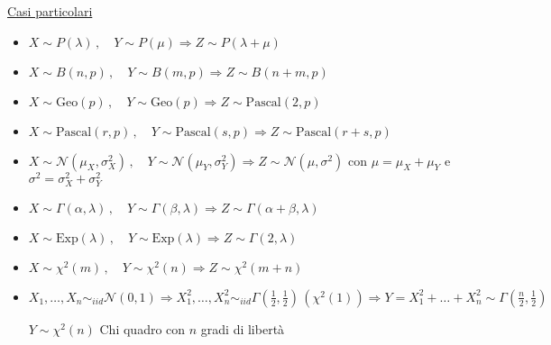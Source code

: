 \documentclass[openany]{book} %
\begin{document}
\underline{Casi particolari}

\begin{itemize}

	\item $X\sim P(\lambda)\,,\quad Y\sim P(\mu)\Rightarrow Z\sim P(\lambda + \mu)$

	\item $X\sim B(n,p)\,,\quad Y\sim B(m,p)\Rightarrow Z\sim B(n+m,p)$

	\item $X\sim \text{Geo}(p)\,,\quad Y\sim \text{Geo}(p)\Rightarrow Z\sim \text{Pascal}(2,p)$

	\item $X\sim \text{Pascal}(r,p)\,,\quad Y\sim \text{Pascal}(s,p)\Rightarrow Z\sim \text{Pascal}(r+s,p)$

	\item $X\sim \mathcal{N}(\mu_X,\sigma_X^2)\,,\quad Y\sim \mathcal{N}(\mu_Y,\sigma_Y^2)\Rightarrow Z\sim \mathcal{N}(\mu,\sigma^2)$ con $\mu=\mu_X+\mu_Y$ e $\sigma^2=\sigma_X^2+\sigma_Y^2$

	\item $X\sim \Gamma(\alpha,\lambda)\,,\quad Y\sim \Gamma(\beta,\lambda)\Rightarrow Z\sim \Gamma(\alpha+\beta,\lambda)$

	\item $X\sim \text{Exp}(\lambda)\,,\quad Y\sim \text{Exp}(\lambda)\Rightarrow Z\sim \Gamma(2,\lambda)$

	\item $X\sim\chi^2(m)\,,\quad Y\sim\chi^2(n)\Rightarrow Z\sim\chi^2(m+n)$

	\item $X_1,\dots, X_n \sim_{iid} \mathcal{N}(0,1)\Rightarrow X_1^2,\dots, X_n^2 \sim_{iid}\Gamma(\frac{1}{2},\frac{1}{2})\,(\chi^2(1))\Rightarrow Y=X_1^2+\dots+X_n^2\sim\Gamma(\frac{n}{2},\frac{1}{2})$

	      $Y\sim\chi^2(n)$ Chi quadro con $n$ gradi di libertà

\end{itemize}
\end{document}

